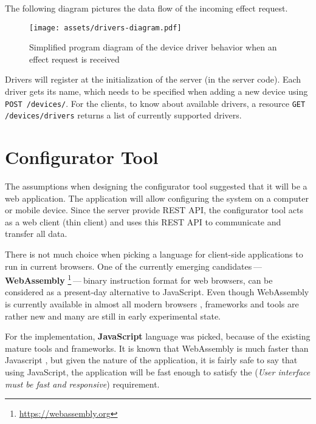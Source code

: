 The following diagram pictures the data flow of the incoming effect request.

\begin{figure}[h]{}
\centering\texttt{[image: assets/drivers-diagram.pdf]}
\caption{Simplified program diagram of the device driver behavior when an effect request is received}
\end{figure}

Drivers will register at the initialization of the server (in the server code).
Each driver gets its name, which needs to be specified when adding a new
device using \texttt{POST /devices/}. For the clients, to know about available
drivers, a resource \texttt{GET /devices/drivers} returns a list
of currently supported drivers.


\hypertarget{x-configurator-tool}{\section{Configurator Tool}}
The assumptions when designing the configurator tool suggested that it will
be a web application. The application will allow configuring the system
on a computer or mobile device. Since the server provide REST API,
the configurator tool acts as a
web client (thin client) and uses this REST API to communicate and transfer
all data.


There is not much choice when picking a language for client-side applications
to run in current browsers. One of the currently
emerging candidates — \textbf{WebAssembly} \footnote{\href{https://webassembly.org}{https://webassembly.org}} — binary instruction format for web browsers, can be considered as
a present-day alternative to JavaScript. Even though WebAssembly is
currently available in almost all modern browsers \cite{wasmroadmap}, frameworks
and tools are rather new and many are still in early experimental state.


For the implementation, \textbf{JavaScript} language was picked, because
of the existing mature tools and frameworks. It is known that WebAssembly
is much faster than Javascript \cite{wasmfast}, but given the nature of the
application, it is fairly safe to say that using JavaScript, the application
will be fast enough to satisfy the \hyperlink{./05-analysis}{}
(\emph{User interface must be fast and responsive})
requirement.



